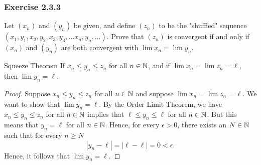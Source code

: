 \subsubsection{Exercise 2.3.3}
Let \( (x_n)  \) and \( (y_n) \) be given, and define \( (z_n) \) to be the "shuffled" sequence \( (x_1, y_1, x_2, y_2, x_3, y_3, \dots x_n, y_n, \dots ). \) Prove that \( (z_n) \) is convergent if and only if \( (x_n) \) and \( (y_n) \) are both convergent with \( \lim x_n = \lim y_n \).
\begin{theorem}{Squeeze Theorem}{}
        If \( x_n \leq y_n \leq z_n\) for all \( n \in \mathbb{N} \), and if \( \lim x_n = \lim z_n = \ell\), then \( \lim y_n = \ell\).
    \end{theorem}
\begin{proof}
    Suppose \( x_n \leq y_n \leq z_n\) for all \( n \in \mathbb{N} \) and suppose \( \lim x_n = \lim z_n = \ell\). We want to show that \( \lim y_n = \ell\). By the Order Limit Theorem, we have \( x_n \leq y_n \leq z_n \) for all \( n \in \mathbb{N} \) implies that \( \ell \leq y_n \leq \ell\) for all \( n \in \mathbb{N} \). But this means that \( y_n = \ell\) for all \( n \in \mathbb{N} \). Hence, for every \( \epsilon  > 0\), there exists an \( N \in \mathbb{N}\) such that for every \( n \geq N\) 
    \[ | y_n - \ell | = | \ell - \ell | = 0 < \epsilon.\]
    Hence, it follows that \( \lim y_n = \ell\).
\end{proof}

